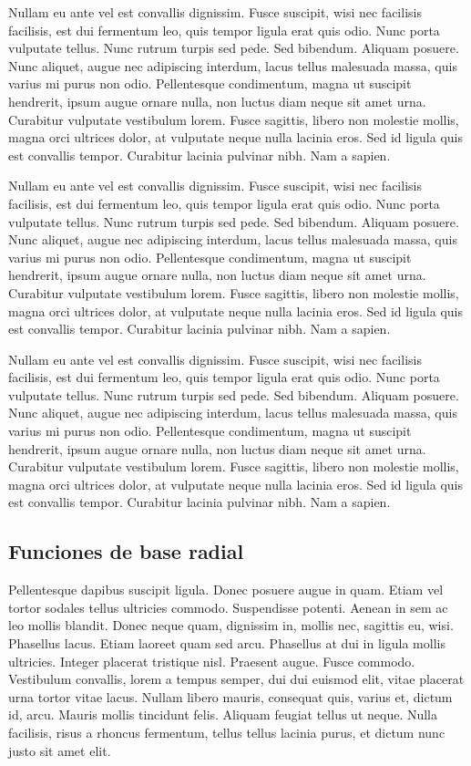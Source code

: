Nullam eu ante vel est convallis dignissim.  Fusce suscipit, wisi nec
facilisis facilisis, est dui fermentum leo, quis tempor ligula erat
quis odio.  Nunc porta vulputate tellus.  Nunc rutrum turpis sed pede.
Sed bibendum.  Aliquam posuere.  Nunc aliquet, augue nec adipiscing
interdum, lacus tellus malesuada massa, quis varius mi purus non odio.
Pellentesque condimentum, magna ut suscipit hendrerit, ipsum augue
ornare nulla, non luctus diam neque sit amet urna.  Curabitur
vulputate vestibulum lorem.  Fusce sagittis, libero non molestie
mollis, magna orci ultrices dolor, at vulputate neque nulla lacinia
eros.  Sed id ligula quis est convallis tempor.  Curabitur lacinia
pulvinar nibh.  Nam a sapien.


Nullam eu ante vel est convallis dignissim.  Fusce suscipit, wisi nec
facilisis facilisis, est dui fermentum leo, quis tempor ligula erat
quis odio.  Nunc porta vulputate tellus.  Nunc rutrum turpis sed pede.
Sed bibendum.  Aliquam posuere.  Nunc aliquet, augue nec adipiscing
interdum, lacus tellus malesuada massa, quis varius mi purus non odio.
Pellentesque condimentum, magna ut suscipit hendrerit, ipsum augue
ornare nulla, non luctus diam neque sit amet urna.  Curabitur
vulputate vestibulum lorem.  Fusce sagittis, libero non molestie
mollis, magna orci ultrices dolor, at vulputate neque nulla lacinia
eros.  Sed id ligula quis est convallis tempor.  Curabitur lacinia
pulvinar nibh.  Nam a sapien.


Nullam eu ante vel est convallis dignissim.  Fusce suscipit, wisi nec
facilisis facilisis, est dui fermentum leo, quis tempor ligula erat
quis odio.  Nunc porta vulputate tellus.  Nunc rutrum turpis sed pede.
Sed bibendum.  Aliquam posuere.  Nunc aliquet, augue nec adipiscing
interdum, lacus tellus malesuada massa, quis varius mi purus non odio.
Pellentesque condimentum, magna ut suscipit hendrerit, ipsum augue
ornare nulla, non luctus diam neque sit amet urna.  Curabitur
vulputate vestibulum lorem.  Fusce sagittis, libero non molestie
mollis, magna orci ultrices dolor, at vulputate neque nulla lacinia
eros.  Sed id ligula quis est convallis tempor.  Curabitur lacinia
pulvinar nibh.  Nam a sapien.

\subsection{Funciones de base radial}

Pellentesque dapibus suscipit ligula.  Donec posuere augue in quam.
Etiam vel tortor sodales tellus ultricies commodo.  Suspendisse
potenti.  Aenean in sem ac leo mollis blandit.  Donec neque quam,
dignissim in, mollis nec, sagittis eu, wisi.  Phasellus lacus.  Etiam
laoreet quam sed arcu.  Phasellus at dui in ligula mollis ultricies.
Integer placerat tristique nisl.  Praesent augue.  Fusce commodo.
Vestibulum convallis, lorem a tempus semper, dui dui euismod elit,
vitae placerat urna tortor vitae lacus.  Nullam libero mauris,
consequat quis, varius et, dictum id, arcu.  Mauris mollis tincidunt
felis.  Aliquam feugiat tellus ut neque.  Nulla facilisis, risus a
rhoncus fermentum, tellus tellus lacinia purus, et dictum nunc justo
sit amet elit.

